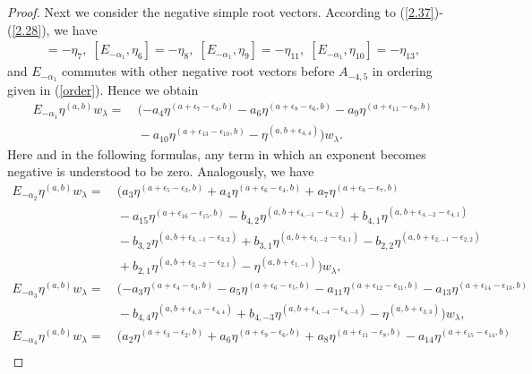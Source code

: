 \documentclass[12pt]{article}
\numberwithin{equation}{section}
\theoremstyle{definition}
\theoremstyle{remark}
\begin{document}
\begin{proof}
	Next we consider the negative simple root vectors. According to (\ref{2.37})-(\ref{2.28}), we have
	\begin{eqnarray}
		[E_{-\alpha_1},\eta_4]=-\eta_7,\;[E_{-\alpha_1},\eta_6]=-\eta_8,\;[E_{-\alpha_1},\eta_{9}]=-\eta_{11},\;[E_{-\alpha_1},\eta_{10}]=-\eta_{13},
	\end{eqnarray}
	and $E_{-\alpha_1}$ commutes with other negative root vectors before $A_{-4,5}$ in ordering given in (\ref{order}). Hence we obtain
	\begin{align}
		E_{-\alpha_1}\eta^{(a,b)}w_{\lambda}=&\:(-a_4\eta^{(a+\epsilon_7-\epsilon_4,b)}-a_6\eta^{(a+\epsilon_8-\epsilon_6,b)}-a_{9}\eta^{(a+\epsilon_{11}-\epsilon_{9},b)}\nonumber\\
		&\:-a_{10}\eta^{(a+\epsilon_{13}-\epsilon_{10},b)}-\eta^{(a,b+\epsilon_{4,4})})w_{\lambda}.\label{-al1}
	\end{align}
	Here and in the following formulas, any term in which an exponent becomes negative is understood to be zero. Analogously, we have
	\begin{align}
		E_{-\alpha_2}\eta^{(a,b)}w_{\lambda}=&\:(a_3\eta^{(a+\epsilon_5-\epsilon_3,b)}+a_4\eta^{(a+\epsilon_6-\epsilon_4,b)}+a_7\eta^{(a+\epsilon_8-\epsilon_7,b)}\nonumber  \\
		&\:-a_{15}\eta^{(a+\epsilon_{16}-\epsilon_{15},b)}-b_{4,2}\eta^{(a,b+\epsilon_{4,-1}-\epsilon_{4,2})}+b_{4,1}\eta^{(a,b+\epsilon_{4,-2}-\epsilon_{4,1})}\nonumber\\
		&\:-b_{3,2}\eta^{(a,b+\epsilon_{3,-1}-\epsilon_{3,2})}+b_{3,1}\eta^{(a,b+\epsilon_{3,-2}-\epsilon_{3,1})}-b_{2,2}\eta^{(a,b+\epsilon_{2,-1}-\epsilon_{2,2})}\nonumber\\
		&\:+b_{2,1}\eta^{(a,b+\epsilon_{2,-2}-\epsilon_{2,1})}-\eta^{(a,b+\epsilon_{1,-1})})w_{\lambda}, \label{-al2}
	\end{align}
	\begin{align}
		E_{-\alpha_3}\eta^{(a,b)}w_{\lambda}=&\: (-a_3\eta^{(a+\epsilon_4-\epsilon_3,b)}-a_{5}\eta^{(a+\epsilon_6-\epsilon_5,b)} -a_{11}\eta^{(a+\epsilon_{12}-\epsilon_{11},b)}-a_{13}\eta^{(a+\epsilon_{14}-\epsilon_{13},b)}\nonumber\\
		&\:-b_{4,4}\eta^{(a,b+\epsilon_{4,3}-\epsilon_{4,4})}+b_{4,-3}\eta^{(a,b+\epsilon_{4,-4}-\epsilon_{4,-3})}-\eta^{(a,b+\epsilon_{3,3})})w_{\lambda}, 
	\end{align}
	\begin{align}
		E_{-\alpha_4}\eta^{(a,b)}w_{\lambda}=&\: (a_2\eta^{(a+\epsilon_3-\epsilon_2,b)}+a_{6}\eta^{(a+\epsilon_9-\epsilon_6,b)} +a_{8}\eta^{(a+\epsilon_{11}-\epsilon_{8},b)}-a_{14}\eta^{(a+\epsilon_{15}-\epsilon_{14},b)}\nonumber\\ 

\end{align}
\end{proof}
\end{document}
